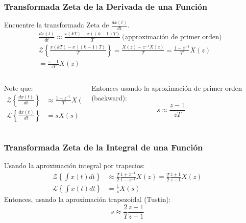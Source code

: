\documentclass[aspectratio=169]{beamer}
\theoremstyle{definition}
\theoremstyle{plain}
\theoremstyle{remark}
\begin{document}
\begin{frame}[c]\frametitle{Transformada Zeta de la Derivada de una Función}
	Encuentre la transformada Zeta de $\frac{dx(t)}{dt}$.
	\pause
	\begin{align*}
		&\frac{dx(t)}{dt} \approx \frac{x(kT) - x((k-1)T)}{T}\ \text{(approximación de primer orden)}\\
		&\mathcal{Z}\left\{\frac{x(kT) - x((k-1)T)}{T}\right\} = \frac{X(z)-z^{-1}X(z)}{T} = \frac{1-z^{-1}}{T} X(z)\\
		&= \frac{z-1}{zT} X(z)
	\end{align*}
	\vspace*{-3mm}
	\begin{columns}
		\pause
		\begin{column}{0.5\textwidth}
			Note que:
			\begin{align*}
				\mathcal{Z}\left\{\frac{dx(t)}{dt}\right\} &\approx \frac{1-z^{-1}}{T} X(z) \\
				\mathcal{L}\left\{\frac{dx(t)}{dt}\right\} &= s X(s)
			\end{align*}
		\end{column}
		\pause
		\begin{column}{0.5\textwidth}
		Entonces usando la aproximación de primer orden (backward):
		\begin{equation*}
			s \approx \frac{z-1}{zT}
		\end{equation*}
		\end{column}
	\end{columns}
\end{frame}

\begin{frame}[c]\frametitle{Transformada Zeta de la Integral de una Función}
	Usando la aproximación integral por trapecios:
	\begin{align*}
				\mathcal{Z}\left\{\int x(t) dt\right\} &\approx \frac{T}{2} \frac{1+z^{-1}}{1-z^{-1}} X(z) = \frac{T}{2} \frac{z+1}{z-1} X(z) \\
				\mathcal{L}\left\{\int x(t) dt\right\} &= \frac{1}{s} X(s)
	\end{align*}
	\pause
	Entonces, usando la aproximación trapezoidal (Tustin):
	\begin{equation*}
		s \approx \frac{2}{T}\frac{z-1}{z+1}
	\end{equation*}
\end{frame}
\end{document}
